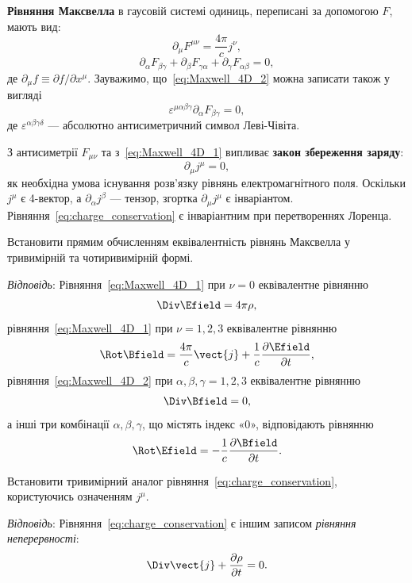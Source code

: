 \textbf{Рівняння Максвелла} в гаусовій системі одиниць, переписані за допомогою $F$, мають вид:
\begin{equation}\label{eq:Maxwell_4D_1}
    \partial_{\mu}F^{\mu\nu} = \frac{4\pi}{c}j^{\nu},
\end{equation}
\begin{equation}\label{eq:Maxwell_4D_2}
    \partial_{\alpha}F_{\beta\gamma}
    + \partial_{\beta}F_{\gamma\alpha}
    + \partial_{\gamma}F_{\alpha\beta} = 0,
\end{equation}
де $\partial_{\mu}f \equiv \partial f/\partial x^{\mu}$. Зауважимо, що~\eqref{eq:Maxwell_4D_2} можна записати також у вигляді
\begin{equation*}
    \varepsilon^{\mu\alpha\beta\gamma}\partial_{\alpha}F_{\beta\gamma} = 0,
\end{equation*}
де $\varepsilon^{\alpha\beta\gamma\delta}$ --- абсолютно антисиметричний символ Леві-Чівіта.

З антисиметрії $F_{\mu\nu}$ та з~\eqref{eq:Maxwell_4D_1} випливає \textbf{закон збереження заряду}:
\begin{equation}\label{eq:charge_conservation}
    \partial_{\mu}j^{\mu} = 0,
\end{equation}
як необхідна умова існування розв'язку рівнянь електромагнітного поля. Оскільки $j^{\mu}$ є 4-вектор, а $\partial_{\alpha}j^{\beta}$ --- тензор, згортка $\partial_{\mu}j^{\mu}$ є інваріантом. Рівняння~\eqref{eq:charge_conservation} є інваріантним при перетвореннях Лоренца.

\begin{problem}
Встановити прямим обчисленням еквівалентність рівнянь Максвелла у тривимірній та чотиривимірній формі.

\textit{Відповідь}: Рівняння~\eqref{eq:Maxwell_4D_1} при $\nu=0$ еквівалентне рівнянню
\[
    \Div\Efield = 4\pi\rho,
\]
рівняння~\eqref{eq:Maxwell_4D_1} при $\nu=1,2,3$ еквівалентне рівнянню
\[
    \Rot\Bfield = \frac{4\pi}{c}\vect{j}
    + \frac{1}{c}\frac{\partial\Efield}{\partial t},
\]
рівняння~\eqref{eq:Maxwell_4D_2} при $\alpha,\beta,\gamma=1,2,3$ еквівалентне рівнянню
\[
    \Div\Bfield = 0,
\]
а інші три комбінації $\alpha,\beta,\gamma$, що містять індекс «0», відповідають рівнянню
\[
    \Rot\Efield = -\frac{1}{c}\frac{\partial\Bfield}{\partial t}.
\]
\end{problem}

\begin{problem}
Встановити тривимірний аналог рівняння~\eqref{eq:charge_conservation}, користуючись означенням $j^{\mu}$.

\textit{Відповідь}: Рівняння~\eqref{eq:charge_conservation} є іншим записом \emph{рівняння неперервності}:
\[
    \Div\vect{j} + \frac{\partial\rho}{\partial t} = 0.
\]
\end{problem}

